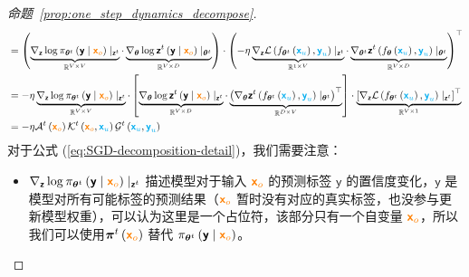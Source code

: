 \documentclass[citestyle=gb7714-2015, bibstyle=gb7714-2015,lang=cn,14pt,scheme=chinese]{elegantbook}
\begin{document}
\begin{proof}[命题~\ref{prop:one_step_dynamics_decompose}]
\begin{equation}
\begin{aligned}
    &= \left( \underbrace{\nabla_{\bm{\mathsf{z}}} \log \pi_{\bm{\theta}^{t}} \left( \bm{\mathsf{y}} \mid \textcolor{orange}{\bm{\mathsf{x}}_{o}} \right) \mid_{\bm{\mathsf{z}}^{t}}}_{\mathbb{R}^{V \times V}} \cdot \underbrace{\nabla_{\bm{\theta}} \log \bm{\mathsf{z}}^{t} \left( \bm{\mathsf{y}} \mid \textcolor{orange}{\bm{\mathsf{x}}_{o}} \right) \mid_{\bm{\theta}^{t}}}_{\mathbb{R}^{V \times D}} \right) \cdot \left( - \eta \underbrace{\nabla_{\bm{\mathsf{z}}} \mathcal{L} \left( f_{\bm{\theta}^{t}} \left( \textcolor{cyan}{\bm{\mathsf{x}}_{u}} \right), \textcolor{cyan}{\bm{\mathsf{y}}_{u}} \right) \mid_{\bm{\mathsf{z}}^{t}}}_{\mathbb{R}^{1 \times V}} \cdot \underbrace{\nabla_{\bm{\theta}^{t}} \bm{\mathsf{z}}^{t} \left( f_{\bm{\theta}} \left( \textcolor{cyan}{\bm{\mathsf{x}}_{u}} \right), \textcolor{cyan}{\bm{\mathsf{y}}_{u}} \right) \mid_{\bm{\theta}^{t}}}_{\mathbb{R}^{V \times D}}  \right)^{\top} \\
     &= - \eta \underbrace{\nabla_{\bm{\mathsf{z}}} \log \pi_{\bm{\theta}^{t}} \left( \bm{\mathsf{y}} \mid \textcolor{orange}{\bm{\mathsf{x}}_{o}} \right) \mid_{\bm{\mathsf{z}}^{t}}}_{\mathbb{R}^{V \times V}} \cdot \left[ \underbrace{\nabla_{\bm{\theta}} \log \bm{\mathsf{z}}^{t} \left( \bm{\mathsf{y}} \mid \textcolor{orange}{\bm{\mathsf{x}}_{o}} \right) \mid_{\bm{\mathsf{z}}^{t}}}_{\mathbb{R}^{V \times D}} \cdot \underbrace{ \left( \nabla_{\bm{\theta}} \bm{\mathsf{z}}^{t} \left( f_{\bm{\theta}^{t}} \left( \textcolor{cyan}{\bm{\mathsf{x}}_{u}} \right), \textcolor{cyan}{\bm{\mathsf{y}}_{u}} \right) \mid_{\bm{\theta}^{t}} \right)^{\top}}_{\mathbb{R}^{D \times V}} \right] \cdot \underbrace{ \left[ \nabla_{\bm{\mathsf{z}}} \mathcal{L} \left( f_{\bm{\theta}^{t}} \left( \textcolor{cyan}{\bm{\mathsf{x}}_{u}} \right), \textcolor{cyan}{\bm{\mathsf{y}}_{u}} \right) \mid_{\bm{\mathsf{z}}^{t}} \right]^{\top}}_{\mathbb{R}^{V \times 1}} \\
     &= - \eta \mathcal{A}^{t} \left( \textcolor{orange}{\bm{\mathsf{x}}_{o}} \right) \mathcal{K}^{t} \left( \textcolor{orange}{\bm{\mathsf{x}}_{o}}, \textcolor{cyan}{\bm{\mathsf{x}}_{u}} \right) \mathcal{G}^{t} \left( \textcolor{cyan}{\bm{\mathsf{x}}_{u}}, \textcolor{cyan}{\bm{\mathsf{y}}_{u}} \right)
\end{aligned}
\end{equation}
对于公式 (\ref{eq:SGD-decomposition-detail})，我们需要注意：
\begin{itemize}
    \item \(\nabla_{\bm{\mathsf{z}}} \log \pi_{\bm{\theta}^{t}} \left( \bm{\mathsf{y}} \mid \textcolor{orange}{\bm{\mathsf{x}}_{o}} \right) \mid_{\bm{\mathsf{z}}^{t}}\) 描述模型对于输入 \(\textcolor{orange}{\bm{\mathsf{x}}_{o}}\) 的预测标签 \(\bm{\mathsf{y}}\) 的置信度变化，\(\bm{\mathsf{y}}\) 是模型对所有可能标签的预测结果（\(\textcolor{orange}{\bm{\mathsf{x}}_{o}}\) 暂时没有对应的真实标签，也没参与更新模型权重），可以认为这里是一个占位符，该部分只有一个自变量 \(\textcolor{orange}{\bm{\mathsf{x}}_{o}}\)，所以我们可以使用\(\bm{\pi}^{t} \left( \textcolor{orange}{\bm{\mathsf{x}}_{o}} \right)\) 替代 \(\pi_{\bm{\theta}^{t}} \left( \bm{\mathsf{y}} \mid \textcolor{orange}{\bm{\mathsf{x}}_{o}} \right)\)。

\end{itemize}
\end{proof}
\end{document}
